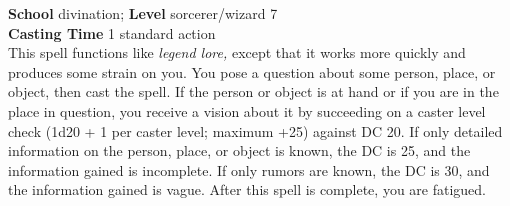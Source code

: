 \textbf{School} divination; \textbf{Level} sorcerer/wizard 7\\
\textbf{Casting Time} 1 standard action\\
This spell functions like \textit{legend lore, }except that it works more quickly and produces some strain on you. You pose a question about some person, place, or object, then cast the spell. If the person or object is at hand or if you are in the place in question, you receive a vision about it by succeeding on a caster level check (1d20 + 1 per caster level; maximum +25) against DC 20. If only detailed information on the person, place, or object is known, the DC is 25, and the information gained is incomplete. If only rumors are known, the DC is 30, and the information gained is vague. After this spell is complete, you are fatigued.\\
